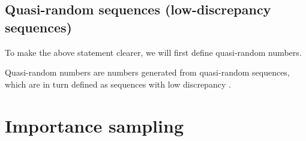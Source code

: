 \documentclass[12pt]{article}
\numberwithin{equation}{section}
\begin{document}
\subsection{Quasi-random sequences (low-discrepancy sequences)}
To make the above statement clearer, we will first define quasi-random numbers.
\par Quasi-random numbers are numbers generated from quasi-random sequences, which are in turn defined as sequences with low discrepancy \cite{quasirandomdiscrepancy}.


\section{Importance sampling}


\end{document}
